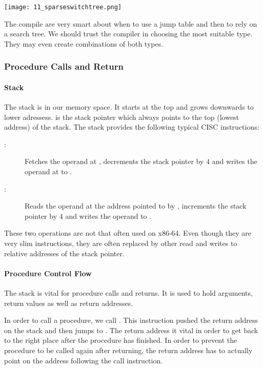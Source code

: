 \texttt{[image: 11\_sparseswitchtree.png]}

The compile are very smart about when to use a jump table and then to rely on a search tree. We should trust the compiler in choosing the most suitable type. They may even create combinations of both types.

\subsubsection{Procedure Calls and Return}
\paragraph{Stack}
The stack is in our memory space. It starts at the top and grows downwards to lower adressess.  is the stack pointer which always points to the top (lowest address) of the stack. The stack provides the following typical CISC instructions:

\begin{description}
    \item[:] Fetches the operand at , decrements the stack pointer by $4$ and writes the operand at to .
    \item[:] Reads the operand at the address pointed to by , increments the stack pointer by $4$ and writes the operand to .
\end{description}

These two operations are not that often used on x86-64. Even though they are very slim instructions, they are often replaced by other read and writes to relative addresses of the stack pointer.

\paragraph{Procedure Control Flow}
The stack is vital for procedure calls and returns. It is used to hold arguments, return values as well as return addresses.

In order to call a procedure, we call . This instruction pushed the return address on the stack and then jumps to . The return address it vital in order to get back to the right place after the procedure has finished. In order to prevent the procedure to be called again after returning, the return address has to actually point on the address following the call instruction.

